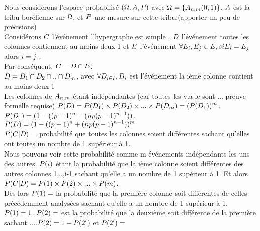 \documentclass[a4paper,11pt]{article}
\begin{document}
Nous considérons l'espace probabilisé
$\mathlarger{(\Omega,A,P)}$ avec $\mathlarger{\Omega=\{A_{n,m}(0,1) \} } $,   $\mathlarger{A}$ est la tribu borélienne sur $\mathlarger{\Omega}$, et $\mathlarger{P}$ une mesure sur cette tribu.(apporter un peu de précisions)\\

Considérons $\mathlarger{C}$ l'événement \og l'hypergraphe est simple \fg{},  $\mathlarger{D}$ l'événement \og toutes les colonnes contiennent au moins deux 1 \fg{} et  $\mathlarger{E}$ l'événement \og  $\mathlarger{\forall E_{i}, E_{j} \in E, si E_{i} = E_{j} }$ alors $\mathlarger{i = j}$ \fg{}.\\
Par conséquent,  $\mathlarger{C = D \cap E}$. \\

$\mathlarger{D=D_{1} \cap D_{2} \cap .. \cap D_{m}}$, avec   $\mathlarger{ \forall D_{i \in I}, D_{i} }$ est l'événement \og la ième colonne contient au moins deux 1 \fg{}\\

Les colonnes de $\mathlarger{A_{n,m} }$ étant indépendantes (car toutes les v.a le sont ... preuve formelle requise)  $\mathlarger{P(D) = P(D_{1}) \times P(D_{2}) \times...\times P(D_{m}) = (P(D_{1}))^{m}}$. \\
 $\mathlarger{P(D_{1}) = (1-((p-1)^{n}+(np(p-1)^{n-1})) }$.\\
 $\mathlarger{P(D) = (1-((p-1)^{n}+(np(p-1)^{n-1}))^{m} }$ \\
 $\mathlarger{P(C|D)}$ = probabilité que toutes les colonnes soient différentes sachant qu'elles ont toutes un nombre de 1 supérieur à 1.\\
 Nous pouvons voir cette probabilité comme m événements indépendants les uns des autres. $\mathlarger{P(i)}$ étant la probabilité que la ième colonne soient différentes des autres colonnes 1,..,i-1 sachant qu'elle a un nombre de 1 supérieur à 1. Et alors $\mathlarger{P(C|D) = P(1) \times P(2) \times...\times P(m)}$.\\
 Dès lors $\mathlarger{P(1)=}$ la probabilité que la première colonne soit différentes de celles précédemment analysées sachant qu'elle a un nombre de 1 supérieur à 1. $\mathlarger{P(1)= 1}$. $\mathlarger{P(2)= }$ est la probabilité que la deuxième soit différente de la première sachant ....$\mathlarger{P(2)=1-P(2') }$ et $\mathlarger{P(2')= }$
 
  
\end{document}
